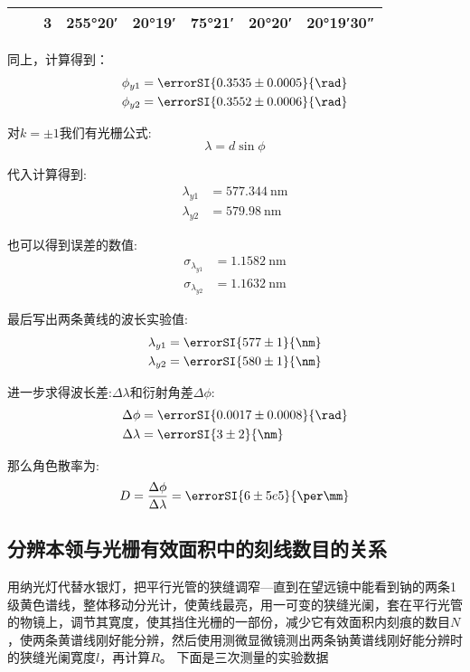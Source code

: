 \documentclass[a4paper]{article}
\begin{document}
\begin{changemargin}{1cm}{1cm}
\begin{table}[htbp]
{\begin{tabular}{cccccccc}
                                                            &                         & 3                  & \ang{255;20;}                  & \ang{20;19;}                                & \ang{75;21;}                   & \ang{20;20;}                                                        & \ang{20;19;30}                                             \\\hline\hline
            \end{tabular}}
    \end{table}\par

    同上，计算得到：
    $$\begin{aligned}
            \phi_{y1} & =\errorSI{0.3535\pm 0.0005}{\rad} \\
            \phi_{y2} & =\errorSI{0.3552\pm 0.0006}{\rad}
        \end{aligned}$$

    对$k=\pm 1$我们有光栅公式:
    $$\lambda = d \sin{\phi}$$

    代入计算得到:
    $$\begin{aligned}
            \lambda_{y1} & =\SI{577.344}{\nm} \\
            \lambda_{y2} & =\SI{579.98}{\nm}
        \end{aligned}$$

    也可以得到误差的数值:
    $$\begin{aligned}
            \sigma_{\lambda_{y1}} & =\SI{1.1582}{\nm} \\
            \sigma_{\lambda_{y2}} & =\SI{1.1632}{\nm}
        \end{aligned}$$

    最后写出两条黄线的波长实验值:
    $$\begin{aligned}
            \lambda_{y1} & =\errorSI{577\pm1}{\nm} \\
            \lambda_{y2} & =\errorSI{580\pm1}{\nm}
        \end{aligned}$$

    进一步求得波长差:$\Delta\lambda$和衍射角差$\Delta\phi$:
    $$\begin{aligned}
            \Delta\phi    & =\errorSI{0.0017\pm0.0008}{\rad} \\
            \Delta\lambda & =\errorSI{3\pm2}{\nm}
        \end{aligned}$$

    那么角色散率为:
    $$D=\frac{\Delta\phi}{\Delta\lambda}=\errorSI{6\pm5e5}{\per\mm}$$

    \subsection{分辨本领与光栅有效面积中的刻线数目的关系}
    \begin{spacing}{1.6}
        用纳光灯代替水银灯，把平行光管的狭缝调窄—直到在望远镜中能看到钠的两条1级黄色谱线，整体移动分光计，使黄线最亮，用一可变的狭缝光阑，套在平行光管的物镜上，调节其寛度，使其挡住光栅的一部份，减少它有效面积内刻痕的数目$N$，使两条黄谱线刚好能分辨，然后使用测微显微镜测出两条钠黄谱线刚好能分辨时的狭缝光阑寛度$l$，再计算$R$。
        下面是三次测量的实验数据


\end{spacing}
\end{changemargin}
\end{document}
